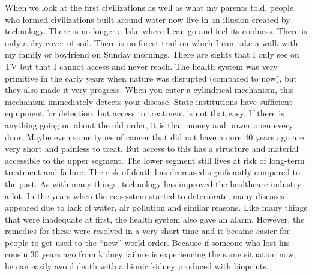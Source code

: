 \documentclass[]{book}
\begin{document}
When we look at the first civilizations as well as what my parents told, people who formed civilizations built around water now live in an illusion created by technology. There is no longer a lake where I can go and feel its coolness. There is only a dry cover of soil. There is no forest trail on which I can take a walk with my family or boyfriend on Sunday mornings. There are sights that I only see on TV but that I cannot access and never reach. The health system was very primitive in the early years when nature was disrupted (compared to now), but they also made it very progress. When you enter a cylindrical mechanism, this mechanism immediately detects your disease. State institutions have sufficient equipment for detection, but access to treatment is not that easy. If there is anything going on about the old order, it is that money and power open every door. Maybe even some types of cancer that did not have a cure 40 years ago are very short and painless to treat. But access to this has a structure and material accessible to the upper segment. The lower segment still lives at risk of long-term treatment and failure. The risk of death has decreased significantly compared to the past. As with many things, technology has improved the healthcare industry a lot. In the years when the ecosystem started to deteriorate, many diseases appeared due to lack of water, air pollution and similar reasons. Like many things that were inadequate at first, the health system also gave an alarm. However, the remedies for these were resolved in a very short time and it became easier for people to get used to the ``new'' world order. Because if someone who lost his cousin 30 years ago from kidney failure is experiencing the same situation now, he can easily avoid death with a bionic kidney produced with bioprints.
\end{document}
